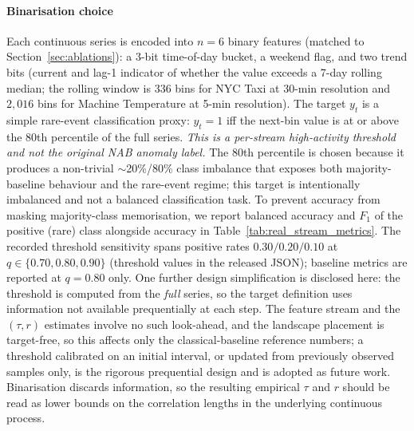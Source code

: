 \documentclass[sensors,article,submit,pdftex,moreauthors]{Definitions/mdpi}
\providecommand{\DIFadd}[1]{{\protect\color{blue}#1}} %
\providecommand{\DIFdel}[1]{} %
\providecommand{\DIFaddbegin}{} %
\providecommand{\DIFaddend}{} %
\providecommand{\DIFdelbegin}{} %
\providecommand{\DIFdelend}{} %
\begin{document}
\paragraph{Binarisation choice} Each continuous series is encoded into $n = 6$ binary features (matched to Section~\ref{sec:ablations}): a 3-bit time-of-day bucket, a weekend flag, and two trend bits (current and lag-1 indicator of whether the value exceeds a 7-day rolling median; the rolling window is $336$ bins for NYC Taxi at 30-min resolution and $2{,}016$ bins for Machine Temperature at 5-min resolution). The target $y_t$ is a simple rare-event classification proxy: $y_t = 1$ iff the next-bin value is at or above the 80th percentile of the full series. \emph{This is a per-stream high-activity threshold and not the original NAB anomaly label.} The 80th percentile is chosen because it produces a non-trivial $\sim$20\%/80\% class imbalance that exposes both majority-baseline behaviour and the rare-event regime; this target is intentionally imbalanced and not a balanced classification task. To prevent accuracy from masking majority-class memorisation, we report balanced accuracy and $F_1$ of the positive (rare) class alongside accuracy in Table~\ref{tab:real_stream_metrics}. \DIFdelbegin \DIFdel{Sensitivity to this threshold (}\DIFdelend \DIFaddbegin \DIFadd{The recorded threshold sensitivity spans positive rates $0.30 / 0.20 / 0.10$ at }\DIFaddend $q \in \{0.70, 0.80, 0.90\}$ \DIFdelbegin \DIFdel{) is recorded in the JSON output for transparency. }\DIFdelend \DIFaddbegin \DIFadd{(threshold values in the released JSON); baseline metrics are reported at $q = 0.80$ only. One further design simplification is disclosed here: the threshold is computed from the }\emph{\DIFadd{full}} \DIFadd{series, so the target definition uses information not available prequentially at each step. The feature stream and the $(\tau, r)$ estimates involve no such look-ahead, and the landscape placement is target-free, so this affects only the classical-baseline reference numbers; a threshold calibrated on an initial interval, or updated from previously observed samples only, is the rigorous prequential design and is adopted as future work. }\DIFaddend Binarisation discards information, so the resulting empirical $\tau$ and $r$ should be read as lower bounds on the correlation lengths in the underlying continuous process.
\end{document}
